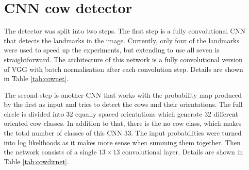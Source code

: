 \documentclass{IET}
\begin{document}
\section{CNN cow detector}

The detector was split into two steps. The first step is a fully convolutional CNN that detects the landmarks in the image. Currently, only four of the landmarks were used to speed up the experiments, but extending to use all seven is straightforward. The architecture of this network is a fully convolutional version of VGG \cite{Simonyan14c} with batch normalisation \cite{DBLP:journals/corr/IoffeS15} after each convolution step. Details are shown in Table \ref{tab:cownet}.

The second step is another CNN that works with the probability map produced by the first as input and tries to detect the cows and their orientations. The full circle is divided into 32 equally spaced orientations which generate 32 different oriented cow classes. In addition to that, there is the no cow class, which makes the total number of classes of this CNN 33. The input probabilities were turned into log likelihoods as it makes more sense when summing them together. Then the network consists of a single $ 13 \times 13 $ convolutional layer. Details are shown in Table \ref{tab:cowdirnet}.
\end{document}
